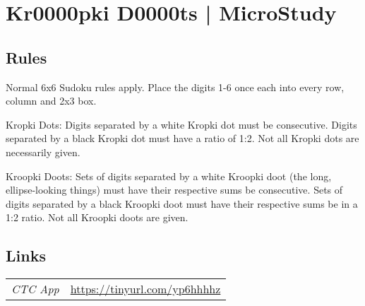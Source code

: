 \section[Kr0000pki D0000ts | MicroStudy {[\emph{Sudoku, Kropki Pairs, Kroopki Doots}]}]{Kr0000pki D0000ts | {\normalfont MicroStudy}}
\label{sec:24-kr0000pki-d0000ts-microstudy}

\subsection*{Rules}
\begin{markdown}
Normal 6x6 Sudoku rules apply. Place the digits 1-6 once each into every row, column and 2x3 box.



Kropki Dots: Digits separated by a white Kropki dot must be consecutive. Digits separated by a black Kropki dot must have a ratio of 1:2. Not all Kropki dots are necessarily given.



Kroopki Doots: Sets of digits separated by a white Kroopki doot (the long, ellipse-looking things) must have their respective sums be consecutive. Sets of digits separated by a black Kroopki doot must have their respective sums be in a 1:2 ratio. Not all Kroopki doots are given.
\end{markdown}
\subsection*{Links}
\begin{tabularx}{\textwidth}{l X}
\emph{CTC App} & \url{https://tinyurl.com/yp6hhhhz} \\
\end{tabularx}
\pagebreak
